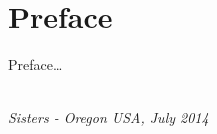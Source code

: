\chapter*{Preface}

Preface\ldots



\begin{flushright}
{\makeatletter\itshape
    \@author \\
    Sisters - Oregon USA, July 2014
\makeatother}
\end{flushright}

